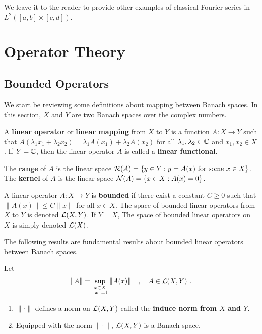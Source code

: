 We leave it to the reader to provide other examples of classical
Fourier series in $\displaystyle L^2([a,b]\times[c,d])$.

\section{Operator Theory}

\subsection{Bounded Operators}

We start be reviewing some definitions about mapping between Banach spaces.
In this section, $X$ and $Y$ are two Banach spaces over the complex
numbers.

\begin{defn}
A {\bfseries linear operator}
or {\bfseries linear mapping} from $X$
to $Y$ is a function $A:X \rightarrow Y$ such that
$A(\lambda_1 x_1 + \lambda_2 x_2) = \lambda_1 A(x_1) + \lambda_2 A(x_2)$
for all $\lambda_1, \lambda_2 \in \mathbb{C}$ and $x_1, x_2 \in X$.
If $Y=\mathbb{C}$, then the linear operator $A$ is called a
{\bfseries linear functional}.

The {\bfseries range} of $A$ is the
linear space
$\displaystyle \mathcal{R}(A) = \left\{ y \in Y : y = A(x) \ \text{for some} \ x\in X\right\}$.
The {\bfseries kernel} of $A$ is
the linear space
$\displaystyle \mathcal{N}(A) = \left\{ x \in X : A(x) = 0 \right\}$.
\end{defn}

\begin{defn}
A linear operator $A:X\rightarrow Y$ is
{\bfseries bounded} if there
exist a constant $C\geq 0$ such that $\|A(x)\| \leq C \|x\|$ for all
$x\in X$. The space of bounded linear operators from $X$ to $Y$ is
denoted $\mathcal{L}(X,Y)$.  If $Y=X$, The space of bounded linear operators
on $X$ is simply denoted $\mathcal{L}(X)$.
\end{defn}

The following results are fundamental results about bounded linear
operators between Banach spaces.

\begin{prop}
Let
\[
\|A\| = \sup_{\substack{x\in X\\ \|x\|=1}} \|A(x)\| \quad ,
\quad A \in \mathcal{L}(X,Y) \ .
\]
\begin{enumerate}
\item $\|\cdot\|$ defines a norm on $\mathcal{L}(X,Y)$ called the
{\bfseries induce norm from $X$ and $Y$}.
\item Equipped with the norm $\|\cdot\|$, $\mathcal{L}(X,Y)$ is a Banach
space.
\end{enumerate}
\end{prop}

